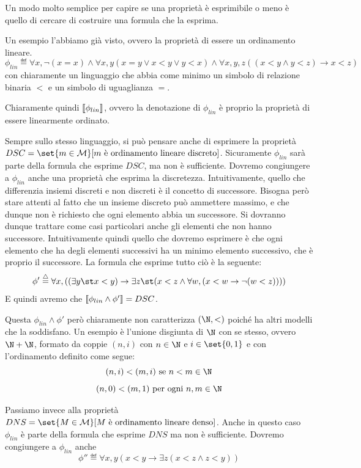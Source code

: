 Un modo molto semplice per capire se una proprietà è esprimibile o meno è quello di cercare di costruire una formula che la esprima. 

Un esempio l'abbiamo già visto, ovvero la proprietà di essere un ordinamento lineare.
\[\phi_{lin}\eqdef\forall x, \neg (x=x) \land \forall x,y (x=y\lor x<y \lor y<x) \land \forall x,y,z ((x<y \land y<z) \to x<z)\]
con chiaramente un linguaggio che abbia come minimo un simbolo di relazione binaria \(<\) e un simbolo di uguaglianza \(=\).

Chiaramente quindi \(\den{\phi_{lin}}\), ovvero la denotazione di \(\phi_{lin}\) è proprio la proprietà di essere linearmente ordinato.

Sempre sullo stesso linguaggio, si può pensare anche di esprimere la proprietà \(DSC = \set{m\in\mathcal{M}}[ m \text{ è ordinamento lineare discreto}]\). Sicuramente \(\phi_{lin}\) sarà parte della formula che esprime \(DSC\), ma non è sufficiente. Dovremo congiungere a \(\phi_{lin}\) anche una proprietà che esprima la discretezza. Intuitivamente, quello che differenzia insiemi discreti e non discreti è il concetto di successore. Bisogna però stare attenti al fatto che un insieme discreto può ammettere massimo, e che dunque non è richiesto che ogni elemento abbia un successore. Si dovranno dunque trattare come casi particolari anche gli elementi che non hanno successore. Intuitivamente quindi quello che dovremo esprimere è che ogni elemento che ha degli elementi successivi ha un minimo elemento successivo, che è proprio il successore. La formula che esprime tutto ciò è la seguente:
\[\phi' \eqdef \forall x, ((\exists y \st x< y) \to \exists z \st(x<z \land \forall w, (x<w \to \neg(w<z))))\]
E quindi avremo che \(\den{\phi_{lin} \land \phi'} = DSC\).

Questa \(\phi_{lin} \land \phi'\) però chiaramente non caratterizza \((\N,<)\) poiché ha altri modelli che la soddisfano. Un esempio è l'unione disgiunta di \(\N\) con se stesso, ovvero \(\N + \N\), formato da coppie \((n,i)\) con \(n \in \N\) e \(i \in \set{0,1}\) e con l'ordinamento definito come segue:
\[(n,i) < (m,i) \text{ se } n < m \in \N\]
\[(n,0) < (m,1) \text{ per ogni } n,m \in \N\]

Passiamo invece alla proprietà \(DNS = \set{M\in\mathcal{M}}[ M \text{ è ordinamento lineare denso}]\). Anche in questo caso \(\phi_{lin}\) è parte della formula che esprime \(DNS\) ma non è sufficiente. Dovremo congiungere a \(\phi_{lin}\) anche
\[\phi''\eqdef \forall x,y (x<y \to \exists z (x<z \land z<y))\]

